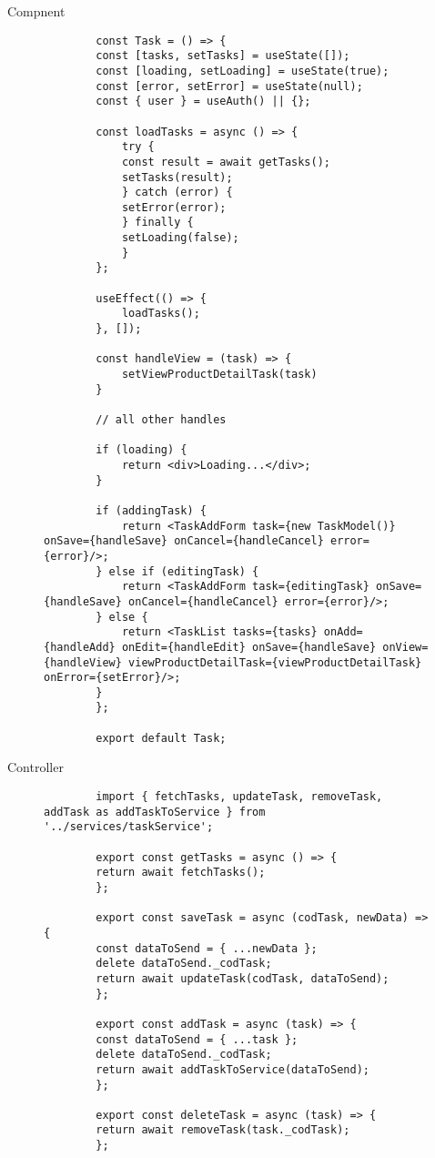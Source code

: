 Compnent
\begin{figure}[H]
    \centering
    \begin{verbatim}
        const Task = () => {
        const [tasks, setTasks] = useState([]);
        const [loading, setLoading] = useState(true);
        const [error, setError] = useState(null);
        const { user } = useAuth() || {};

        const loadTasks = async () => {
            try {
            const result = await getTasks();
            setTasks(result);
            } catch (error) {
            setError(error);
            } finally {
            setLoading(false);
            }
        };

        useEffect(() => {
            loadTasks();
        }, []);
        
        const handleView = (task) => {
            setViewProductDetailTask(task)
        }

        // all other handles

        if (loading) {
            return <div>Loading...</div>;
        }

        if (addingTask) {
            return <TaskAddForm task={new TaskModel()} onSave={handleSave} onCancel={handleCancel} error={error}/>;
        } else if (editingTask) {
            return <TaskAddForm task={editingTask} onSave={handleSave} onCancel={handleCancel} error={error}/>;
        } else {
            return <TaskList tasks={tasks} onAdd={handleAdd} onEdit={handleEdit} onSave={handleSave} onView={handleView} viewProductDetailTask={viewProductDetailTask} onError={setError}/>;
        }
        };

        export default Task;
\end{verbatim}
\end{figure}


Controller
\begin{figure}[H]
    \centering
    \begin{verbatim}
        import { fetchTasks, updateTask, removeTask, addTask as addTaskToService } from '../services/taskService';

        export const getTasks = async () => {
        return await fetchTasks();
        };

        export const saveTask = async (codTask, newData) => {
        const dataToSend = { ...newData };
        delete dataToSend._codTask;
        return await updateTask(codTask, dataToSend);
        };

        export const addTask = async (task) => {
        const dataToSend = { ...task };
        delete dataToSend._codTask;
        return await addTaskToService(dataToSend);
        };

        export const deleteTask = async (task) => {
        return await removeTask(task._codTask);
        };
\end{verbatim}
\end{figure}


